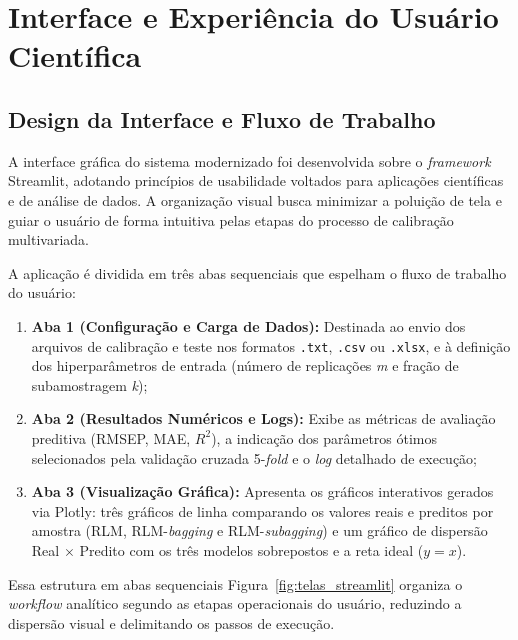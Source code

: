 \chapter{Interface e Experiência do Usuário Científica}
\label{sec:uiux}

\section{Design da Interface e Fluxo de Trabalho}

A interface gráfica do sistema modernizado foi desenvolvida sobre o \textit{framework} Streamlit, adotando princípios de usabilidade voltados para aplicações científicas e de análise de dados. A organização visual busca minimizar a poluição de tela e guiar o usuário de forma intuitiva pelas etapas do processo de calibração multivariada.

A aplicação é dividida em três abas sequenciais que espelham o fluxo de trabalho do usuário:
\begin{enumerate}[label=\alph*)]
    \item \textbf{Aba 1 (Configuração e Carga de Dados):} Destinada ao envio dos arquivos de calibração e teste nos formatos \texttt{.txt}, \texttt{.csv} ou \texttt{.xlsx}, e à definição dos hiperparâmetros de entrada (número de replicações \textit{m} e fração de subamostragem \textit{k});
    \item \textbf{Aba 2 (Resultados Numéricos e Logs):} Exibe as métricas de avaliação preditiva (RMSEP, MAE, $R^2$), a indicação dos parâmetros ótimos selecionados pela validação cruzada 5-\textit{fold} e o \textit{log} detalhado de execução;
    \item \textbf{Aba 3 (Visualização Gráfica):} Apresenta os gráficos interativos gerados via Plotly: três gráficos de linha comparando os valores reais e preditos por amostra (RLM, RLM-\textit{bagging} e RLM-\textit{subagging}) e um gráfico de dispersão Real $\times$ Predito com os três modelos sobrepostos e a reta ideal ($y = x$).
\end{enumerate}

Essa estrutura em abas sequenciais Figura~\ref{fig:telas_streamlit} organiza o \textit{workflow} analítico segundo as etapas operacionais do usuário, reduzindo a dispersão visual e delimitando os passos de execução.

